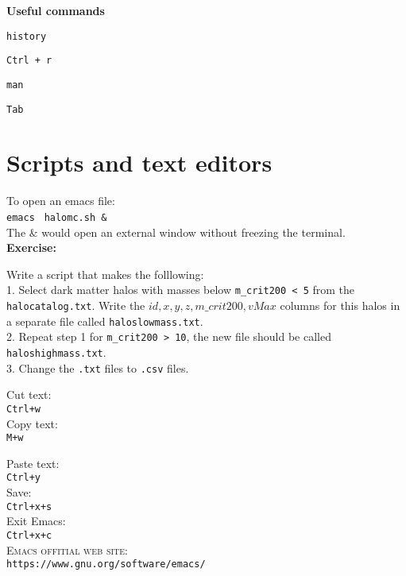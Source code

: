 \documentclass[12pt]{article}
\begin{document}
\textbf{Useful commands}

\verb+history+

\verb"Ctrl + r"

\verb+man+

\verb+Tab+


\section*{Scripts and text editors}

To open an emacs file:\\

\texttt{emacs} \verb" halomc.sh &"  \\

The $\&$ would open an external window without freezing
the terminal.\\

\textbf{Exercise:}

Write a script that makes the folllowing:\\ 

1. Select dark matter halos with masses below
\verb+m_crit200 < 5+ from the \verb+halocatalog.txt+. Write the 
$id, x, y, z, m\_crit200, vMax$ columns for this halos in a 
separate file
called \verb+haloslowmass.txt+.\\

2. Repeat step 1 for \verb+m_crit200 > 10+, the new file should
be called \verb+haloshighmass.txt+.\\

3. Change the \verb+.txt+ files to \verb+.csv+ files.  

Cut text:\\

\texttt{Ctrl+w}\\

Copy text:\\

\texttt{M+w}

Paste text:\\

\texttt{Ctrl+y}\\

Save:\\

\texttt{Ctrl+x+s}\\

Exit Emacs:\\

\texttt{Ctrl+x+c}\\

\textsc{Emacs offitial web site:}\\
\verb"https://www.gnu.org/software/emacs/"\\
\end{document}
